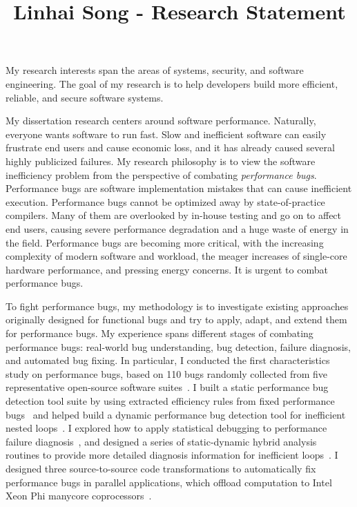 \documentclass[10pt]{article}
\title{\vspace{-.7in}\bf{Linhai Song - Research Statement\vspace{-.4in}}}
\date{}
\begin{document}
\maketitle\vspace{-.2in}

My research interests span the areas of systems, security, and software engineering.
The goal of my research is to help developers build more efficient, reliable, and secure software systems.

My dissertation research centers around software performance. 
Naturally, everyone wants software to run fast. 
Slow and inefficient software can easily frustrate end users and cause economic loss,
and it has already caused several highly publicized failures. 
My research philosophy is to view the software inefficiency problem from the perspective of combating \textit{performance bugs}.
Performance bugs are software implementation mistakes that can cause inefficient execution.
Performance bugs cannot be optimized away by state-of-practice compilers. 
Many of them are overlooked by in-house testing and go on to affect end users, 
causing severe performance degradation and a huge waste of energy in the field. 
Performance bugs are becoming more critical, with the increasing complexity of modern software and workload, 
the meager increases of single-core hardware performance, 
and pressing energy concerns. 
It is urgent to combat performance bugs.

To fight performance bugs, my methodology is to investigate existing approaches originally
designed for functional bugs and try to apply, adapt, and extend them for performance bugs.
My experience spans different
stages of combating performance bugs: 
real-world bug understanding, bug detection,
failure diagnosis, and automated bug fixing.
In particular, 
I conducted the first characteristics study on performance bugs, 
based on 110 bugs randomly collected from five representative open-source software suites~\cite{jin12perfbug}.
I built a static performance bug detection tool suite by using extracted efficiency rules from fixed performance bugs~\cite{jin12perfbug} 
and helped build a dynamic performance bug detection tool for inefficient nested loops~\cite{Nistor13ICSE}. 
I explored how to apply statistical debugging to performance failure diagnosis~\cite{Song14OOPSLA}, 
and designed a series of static-dynamic hybrid analysis routines to provide 
more detailed diagnosis information for inefficient loops~\cite{Song17ICSE}.
I designed three source-to-source code transformations to automatically fix performance bugs in parallel applications, 
which offload computation to Intel Xeon Phi manycore coprocessors~\cite{Song14MICRO}. 
\end{document}
